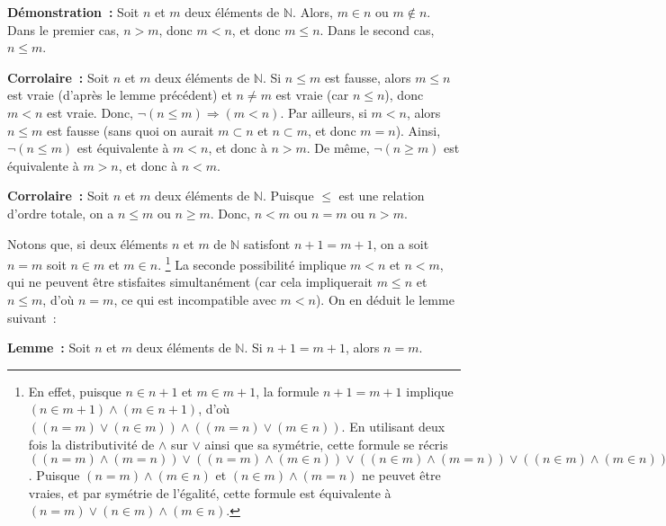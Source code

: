 \medskip

\noindent\textbf{Démonstration :} 
    Soit $n$ et $m$ deux éléments de $\mathbb{N}$. 
    Alors, $m \in n$ ou $m \notin n$. 
    Dans le premier cas, $n > m$, donc $m < n$, et donc $m \leq n$.
    Dans le second cas, $n \leq m$.

   \done 

\medskip

\noindent\textbf{Corrolaire :} Soit $n$ et $m$ deux éléments de $\mathbb{N}$. 
    Si $n \leq m$ est fausse, alors $m \leq n$ est vraie (d'après le lemme précédent) et $n \neq m$ est vraie (car $n \leq n$), donc $m < n$ est vraie. 
    Donc, $\neg (n \leq m) \Rightarrow (m < n)$. 
    Par ailleurs, si $m < n$, alors $n \leq m$ est fausse (sans quoi on aurait $m \subset n$ et $n \subset m$, et donc $m = n$).
    Ainsi, $\neg (n \leq m)$ est équivalente à $m < n$, et donc à $n > m$.
    De même, $\neg (n \geq m)$ est équivalente à $m > n$, et donc à $n < m$.

\medskip

\noindent\textbf{Corrolaire :} Soit $n$ et $m$ deux éléments de $\mathbb{N}$. 
    Puisque $\leq$ est une relation d'ordre totale, on a $n \leq m$ ou $n \geq m$. 
    Donc, $n < m$ ou $n = m$ ou $n > m$. 

\medskip

Notons que, si deux éléments $n$ et $m$ de $\mathbb{N}$ satisfont $n+1 = m+1$, on a soit $n = m$ soit $n \in m$ et $m \in n$.%
\footnote{
    En effet, puisque $n \in n+1$ et $m \in m+1$, la formule $n+1 = m+1$ implique $(n \in m+1) \wedge (m \in n+1)$, d'où $((n = m) \vee (n \in m)) \wedge ((m = n) \vee (m \in n))$. 
    En utilisant deux fois la distributivité de $\wedge$ sur $\vee$ ainsi que sa symétrie, cette formule se récris $((n = m) \wedge (m = n)) \vee ((n = m) \wedge (m \in n)) \vee ((n \in m) \wedge (m = n)) \vee ((n \in m) \wedge (m \in n))$. 
    Puisque $(n = m) \wedge (m \in n)$ et $(n \in m) \wedge (m = n)$ ne peuvet être vraies, et par symétrie de l'égalité, cette formule est équivalente à $(n = m) \vee (n \in m) \wedge (m \in n)$.
}
La seconde possibilité implique $m < n$ et $n < m$, qui ne peuvent être stisfaites simultanément (car cela impliquerait $m \leq n$ et $n \leq m$, d'où $n = m$, ce qui est incompatible avec $m < n$). 
On en déduit le lemme suivant :

\medskip

\noindent\textbf{Lemme :} 
    Soit $n$ et $m$ deux éléments de $\mathbb{N}$. 
    Si $n+1 = m+1$, alors $n=m$.

